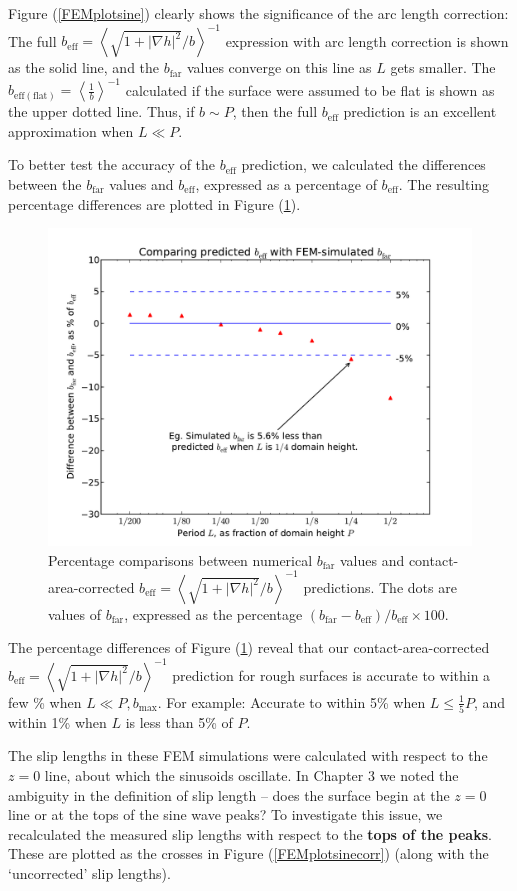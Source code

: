 \documentclass[12pt, a4paper, twoside, openright]{book}
\newcommand{\beff}{\ensuremath{b_{\mathrm{eff}}}}
\newcommand{\bmax}{\ensuremath{b_{\mathrm{max}}}}
\newcommand{\bfar}{\ensuremath{b_{\mathrm{far}}}}
\newcommand{\beffhf}{\ensuremath{b_{\mathrm{eff (flat)}}} = \left< \frac{1}{b} \right>^{-1} }
\newcommand{\beffha}{\ensuremath{b_{\mathrm{eff}}} = \left< \sqrt{1 + |\nabla h|^2} / {b} \right>^{-1} }
\begin{document}
Figure (\ref{FEMplotsine}) clearly shows the significance of the arc length correction: The full $\beffha$ expression with arc length correction is shown as the solid line, and the $\bfar$ values converge on this line as $L$ gets smaller. The $\beffhf$ calculated if the surface were assumed to be flat is shown as the upper dotted line.  Thus, if $b\sim P$, then the full $\beff$ prediction is an excellent approximation when $L \ll P$.

To better test the accuracy of the $\beff$ prediction, we calculated the differences between the $\bfar$ values and $\beff$, expressed as a percentage of $\beff$.  The resulting percentage differences are plotted in Figure (\ref{FEMplotsinepcnt}). 

\clearpage
\begin{figure}[ht]
\includegraphics[scale=0.595]{Lund_Thesis_FEM_plot_sine_pcnt}
\caption{Percentage comparisons between numerical $\bfar$ values and contact-area-corrected $\beffha$ predictions. The dots are values of $\bfar$, expressed as the percentage $(\bfar -\beff)/\beff \times 100 $. }\label{FEMplotsinepcnt}
\end{figure}

The percentage differences of Figure (\ref{FEMplotsinepcnt}) reveal that our contact-area-corrected $\beffha$ prediction for rough surfaces is accurate to within a few \% when $L \ll P, \bmax$.
For example: Accurate to within 5\% when $L \leq \frac{1}{5}P$, and within 1\% when $L$ is less than 5\% of $P$.

The slip lengths in these FEM simulations were calculated with respect to the $z=0$ line, about which the sinusoids oscillate.  In Chapter 3 we noted the ambiguity in the definition of slip length -- does the surface begin at the $z=0$ line or at the tops of the sine wave peaks?  To investigate this issue, we recalculated the measured slip lengths with respect to the \textbf{tops of the peaks}.  These are plotted as the crosses in Figure (\ref{FEMplotsinecorr}) (along with the `uncorrected' slip lengths).
\end{document}
